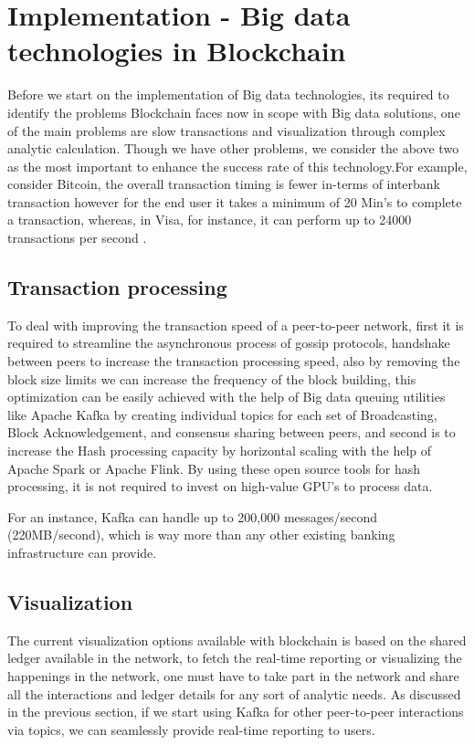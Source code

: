 \documentclass[sigconf]{acmart}
\begin{document}
\section{Implementation - Big data technologies in Blockchain}
Before we start on the implementation of Big data technologies, its required to identify the problems Blockchain faces now in scope with Big data solutions, one of the main problems are slow transactions and visualization through complex analytic calculation. Though we have other problems, we consider the above two as the most important to enhance the success rate of this technology.For example, consider Bitcoin, the overall transaction timing is fewer in-terms of interbank transaction however for the end user it takes a minimum of 20 Min's to complete a transaction, whereas, in Visa, for instance, it can perform up to 24000 transactions per second \cite{Visa}.


\subsection{Transaction processing}
To deal with improving the transaction speed of a peer-to-peer network, first it is required to streamline the asynchronous process of gossip protocols, handshake between peers to increase the transaction processing speed, also by removing the block size limits\cite{Optimize-bitcoin} we can increase the frequency of the block building, this optimization can be easily achieved with the help of Big data queuing utilities like Apache Kafka by creating individual topics for each set of Broadcasting, Block Acknowledgement, and consensus sharing between peers,   and second is to increase the Hash processing capacity by horizontal scaling with the help of Apache Spark or Apache Flink. By using these open source tools for hash processing, it is not required to invest on high-value GPU's to process data.

For an instance, Kafka can handle up to 200,000 messages/second (220MB/second)\cite{kafka-performance}, which is way more than any other existing banking infrastructure can provide.

\subsection{Visualization}
The current visualization options available with blockchain is based on the shared ledger available in the network, to fetch the real-time reporting or visualizing the happenings in the network, one must have to take part in the network and share all the interactions and ledger details for any sort of analytic needs. As discussed in the previous section, if we start using Kafka for other peer-to-peer interactions via topics, we can seamlessly provide real-time reporting to users.
\end{document}
